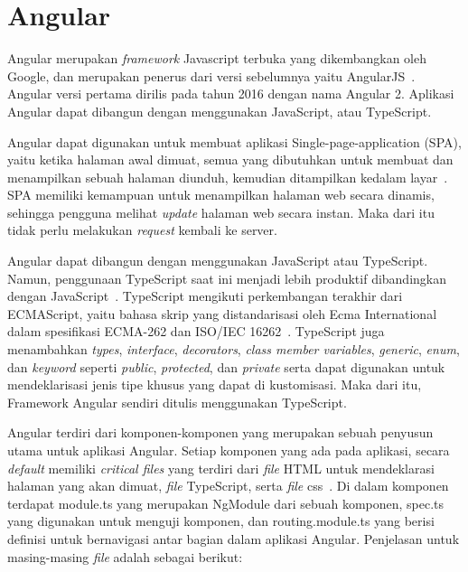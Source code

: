 \section{Angular}
\label{sec:angular} 
Angular merupakan \textit{framework} Javascript terbuka yang dikembangkan oleh Google, dan merupakan penerus dari versi sebelumnya yaitu AngularJS~\cite{fain:18:angular}. Angular versi pertama dirilis pada tahun 2016 dengan nama Angular 2. Aplikasi Angular dapat dibangun dengan menggunakan JavaScript, atau TypeScript.

Angular dapat digunakan untuk membuat aplikasi Single-page-application (SPA), yaitu ketika halaman awal dimuat, semua yang dibutuhkan untuk membuat dan menampilkan sebuah halaman diunduh, kemudian ditampilkan kedalam layar~\cite{scott:15:spa}.  SPA memiliki kemampuan untuk menampilkan halaman web secara dinamis, sehingga pengguna melihat \textit{update} halaman web secara instan. Maka dari itu tidak perlu melakukan \textit{request} kembali ke server.

Angular dapat dibangun dengan menggunakan JavaScript atau TypeScript. Namun, penggunaan TypeScript saat ini menjadi lebih produktif dibandingkan dengan JavaScript~\cite{fain:18:angular}. TypeScript mengikuti perkembangan terakhir dari ECMAScript, yaitu bahasa skrip yang distandarisasi oleh Ecma International dalam spesifikasi ECMA-262 dan ISO/IEC 16262~\cite{rarayan:15:learning}. TypeScript juga menambahkan \textit{types}, \textit{interface}, \textit{decorators}, \textit{class member variables}, \textit{generic}, \textit{enum}, dan \textit{keyword} seperti \textit{public}, \textit{protected}, dan \textit{private} serta dapat digunakan untuk mendeklarisasi jenis tipe khusus yang dapat di kustomisasi. Maka dari itu, Framework Angular sendiri ditulis menggunakan TypeScript.

Angular terdiri dari komponen-komponen yang merupakan sebuah penyusun utama untuk aplikasi Angular. Setiap komponen yang ada pada aplikasi, secara \textit{default} memiliki \textit{critical files} yang terdiri dari \textit{file} HTML untuk mendeklarasi halaman yang akan dimuat, \textit{file} TypeScript, serta \textit{file} css~\cite{gion:18:mastering}. Di dalam komponen terdapat module.ts yang merupakan NgModule dari sebuah komponen, spec.ts yang digunakan untuk menguji komponen, dan routing.module.ts yang berisi definisi untuk bernavigasi antar bagian dalam aplikasi Angular. Penjelasan untuk masing-masing \textit{file} adalah sebagai berikut:

